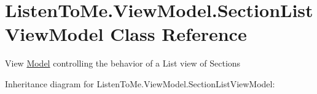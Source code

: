 \hypertarget{class_listen_to_me_1_1_view_model_1_1_section_list_view_model}{}\section{Listen\+To\+Me.\+View\+Model.\+Section\+List\+View\+Model Class Reference}
\label{class_listen_to_me_1_1_view_model_1_1_section_list_view_model}


View \mbox{\hyperlink{namespace_listen_to_me_1_1_model}{Model}} controlling the behavior of a List view of Sections  




Inheritance diagram for Listen\+To\+Me.\+View\+Model.\+Section\+List\+View\+Model\+:
